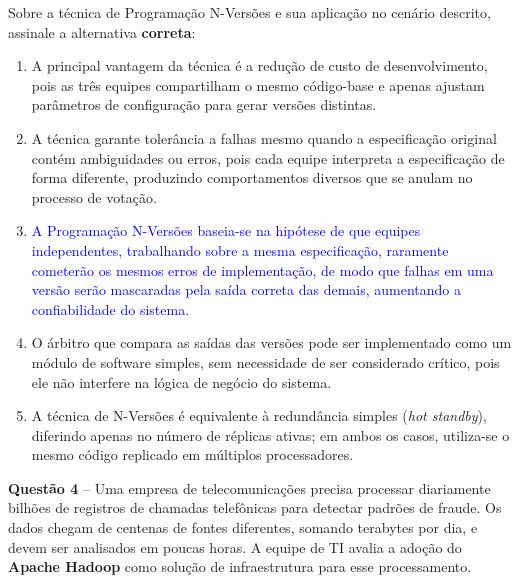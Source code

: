 \documentclass[12pt,a4paper]{article}
\begin{document}
Sobre a técnica de Programação N-Versões e sua aplicação no cenário descrito, assinale a alternativa \textbf{correta}:

\vspace{0.3cm}

\begin{enumerate}[label=\textbf{(\Alph*)}]
    \item A principal vantagem da técnica é a redução de custo de desenvolvimento, pois as três equipes compartilham o mesmo código-base e apenas ajustam parâmetros de configuração para gerar versões distintas.

    \item A técnica garante tolerância a falhas mesmo quando a especificação original contém ambiguidades ou erros, pois cada equipe interpreta a especificação de forma diferente, produzindo comportamentos diversos que se anulam no processo de votação.

    \item[\textcolor{blue}{\textbf{(C)}}] \textcolor{blue}{A Programação N-Versões baseia-se na hipótese de que equipes independentes, trabalhando sobre a mesma especificação, raramente cometerão os mesmos erros de implementação, de modo que falhas em uma versão serão mascaradas pela saída correta das demais, aumentando a confiabilidade do sistema.}

    \item O árbitro que compara as saídas das versões pode ser implementado como um módulo de software simples, sem necessidade de ser considerado crítico, pois ele não interfere na lógica de negócio do sistema.

    \item A técnica de N-Versões é equivalente à redundância simples (\textit{hot standby}), diferindo apenas no número de réplicas ativas; em ambos os casos, utiliza-se o mesmo código replicado em múltiplos processadores.
\end{enumerate}

\vspace{0.5cm}

\textbf{Questão 4} -- Uma empresa de telecomunicações precisa processar diariamente bilhões de registros de chamadas telefônicas para detectar padrões de fraude. Os dados chegam de centenas de fontes diferentes, somando terabytes por dia, e devem ser analisados em poucas horas. A equipe de TI avalia a adoção do \textbf{Apache Hadoop} como solução de infraestrutura para esse processamento.
\end{document}
